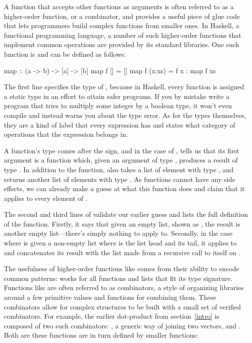 \documentclass[../paper.tex]{subfiles}
\begin{document}
A function that accepts other functions as arguments is often referred to as a higher-order function, or a combinator, and provides a useful piece of glue code that lets programmers build complex functions from smaller ones. In Haskell, a functional programming language, a number of such higher-order functions that implement common operations are provided by its standard libraries. One such function is  and can be defined as follows:

\begin{code}
map :: (a -> b) -> [a] -> [b]
map f []     = []
map f (x:xs) = f x : map f xs
\end{code}

The first line specifies the type of , because in Haskell, every function is assigned a static type in an effort to attain safer programs. If you by mistake write a program that tries to multiply some integer by a boolean type, it won't even compile and instead warns you about the type error. As for the types themselves, they are a kind of label that every expression has and states what category of operations that the expression belongs in.

A function's type comes after the \codei{::} sign, and in the case of , tells us that its first argument is a function  which, given an argument of type , produces a result of type . In addition to the function,  also takes a list  of element with type , and returns another list of elements with type . As functions cannot have any side effects, we can already make a guess at what this function does and claim that it applies  to every element of .

The second and third lines of  validate our earlier guess and lists the full definition of the function. Firstly, it says that given an empty list, shown as \codei{[]}, the result is another empty list---there's simply nothing to apply  to. Secondly, in the case where  is given a non-empty list  where  is the list head and  its tail, it applies  to  and concatenates its result with the list made from a recursive call to itself on .

The usefulness of higher-order functions like  comes from their ability to encode common patterns:  works for all functions and lists that fit its type signature. Functions like  are often referred to as combinators, a style of organizing libraries around a few primitive values and functions for combining them. These combinators allow for complex structures to be built with a small set of verified combinators. For example, the earlier dot-product from section~\ref{intro} is composed of two such combinators: , a generic way of joining two vectors, and . Both are these functions are in turn defined by smaller functions:
\end{document}
